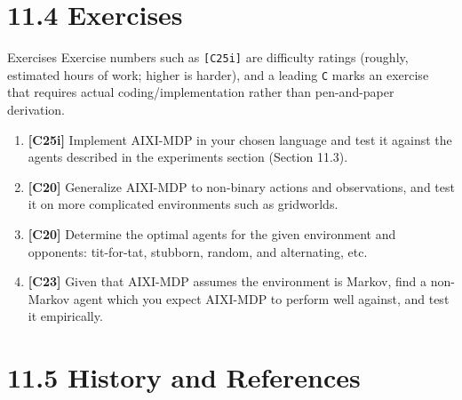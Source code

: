 \documentclass[aspectratio=169,10pt]{beamer}
\begin{document}
\section{11.4 Exercises}

\begin{frame}{Exercises}
  Exercise numbers such as \texttt{[C25i]} are difficulty ratings (roughly,
  estimated hours of work; higher is harder), and a leading \texttt{C}
  marks an exercise that requires actual coding/implementation rather than
  pen-and-paper derivation.
  \begin{enumerate}
    \item \textbf{[C25i]} Implement AIXI-MDP in your chosen language and
      test it against the agents described in the experiments section
      (Section 11.3).
    \item \textbf{[C20]} Generalize AIXI-MDP to non-binary actions and
      observations, and test it on more complicated environments such as
      gridworlds.
    \item \textbf{[C20]} Determine the optimal agents for the given
      environment and opponents: tit-for-tat, stubborn, random, and
      alternating, etc.
    \item \textbf{[C23]} Given that AIXI-MDP assumes the environment is
      Markov, find a non-Markov agent which you expect AIXI-MDP to perform
      well against, and test it empirically.
  \end{enumerate}
\end{frame}

\section{11.5 History and References}
\end{document}
